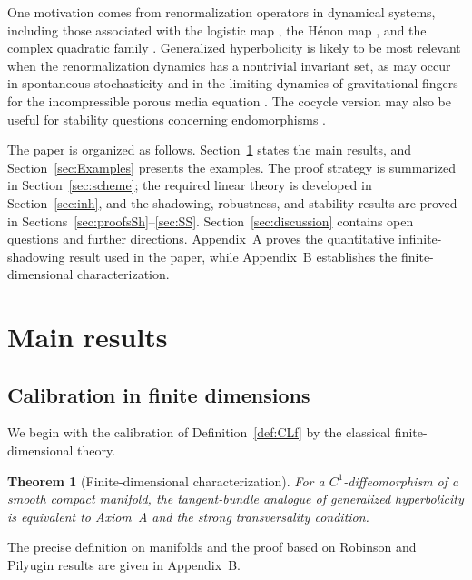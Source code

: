 \documentclass[12pt]{article}
\newtheorem{thm}{Theorem}
\theoremstyle{definition}
\begin{document}
One motivation comes from renormalization operators in dynamical systems, including those associated with the logistic map \cite{RL1,RL2,RL3,RL4}, the Hénon map \cite{RH1,RH2,RH3,RH4}, and the complex quadratic family \cite{RUQ1,RL2,RUQ3}.
Generalized hyperbolicity is likely to be most relevant when the renormalization dynamics has a nontrivial invariant set, as may occur in spontaneous stochasticity \cite{MailRaib1,MailRaib2} and in the limiting dynamics of gravitational fingers for the incompressible porous media equation \cite{otto-menon-2005,Boffetta2,PetrovaTikhomirovEfendiev2025}.
The cocycle version may also be useful for stability questions concerning endomorphisms \cite{End-Berger-Koscard,End-Ikeda,End-Uruguay}.

The paper is organized as follows. 
Section~\ref{sec:thms} states the main results, and Section~\ref{sec:Examples} presents the examples. 
The proof strategy is summarized in Section~\ref{sec:scheme}; the required linear theory is developed in Section~\ref{sec:inh}, and the shadowing, robustness, and stability results are proved in Sections~\ref{sec:proofsSh}--\ref{sec:SS}. 
Section~\ref{sec:discussion} contains open questions and further directions. Appendix~A proves the quantitative infinite-shadowing result used in the paper, while Appendix~B
establishes the finite-dimensional characterization.

\section{Main results}\label{sec:thms}

\subsection{Calibration in finite dimensions}

We begin with the calibration of Definition~\ref{def:CLf} by the classical finite-dimensional theory.

\begin{thm}[Finite-dimensional characterization]
\label{stat:finite-dimensional-characterization}
For a $C^1$-diffeomorphism of a smooth compact manifold, the tangent-bundle analogue of generalized hyperbolicity is equivalent to Axiom~A and the strong transversality condition.
\end{thm}

The precise definition on manifolds and the proof based on Robinson \cite{Robinson1976} and Pilyugin \cite{PilCL} results are given in Appendix~B.
\end{document}

